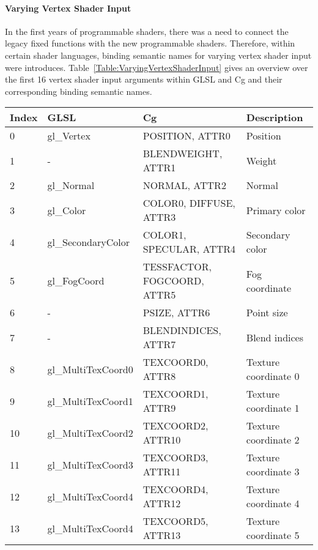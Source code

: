 \paragraph{Varying Vertex Shader Input}
In the first years of programmable shaders, there was a need to connect the legacy fixed functions with the new programmable shaders. Therefore, within certain shader languages, binding semantic names for varying vertex shader input were introduces. Table~\ref{Table:VaryingVertexShaderInput} gives an overview over the first 16 vertex shader input arguments within GLSL and Cg and their corresponding binding semantic names.
\begin{table}[htb]
	\centering
	\begin{ThreePartTable}
		\begin{tabular}{|l|l|p{}|l|}
			\toprule
				\textbf{Index} & \textbf{GLSL\tnote{1}} & \textbf{Cg\tnote{2}} & \textbf{Description}\\
			\midrule
				\hline
				0	&	gl\_Vertex			&	POSITION, ATTR0				&	Position\\
				\hline
				1	&	-					&	BLENDWEIGHT, ATTR1			&	Weight\\
				\hline
				2	&	gl\_Normal			&	NORMAL, ATTR2				&	Normal\\
				\hline
				3	&	gl\_Color			&	COLOR0, DIFFUSE, ATTR3		&	Primary color\\
				\hline
				4	&	gl\_SecondaryColor	&	COLOR1, SPECULAR, ATTR4		&	Secondary color\\
				\hline
				5	&	gl\_FogCoord		&	TESSFACTOR, FOGCOORD, ATTR5	&	Fog coordinate\\
				\hline
				6	&	-					&	PSIZE, ATTR6				&	Point size\\
				\hline
				7	&	-					&	BLENDINDICES, ATTR7			&	Blend indices\\
				\hline
				8	&	gl\_MultiTexCoord0	&	TEXCOORD0, ATTR8			&	Texture coordinate 0\\
				\hline
				9	&	gl\_MultiTexCoord1	&	TEXCOORD1, ATTR9			&	Texture coordinate 1\\
				\hline
				10	&	gl\_MultiTexCoord2	&	TEXCOORD2, ATTR10			&	Texture coordinate 2\\
				\hline
				11	&	gl\_MultiTexCoord3	&	TEXCOORD3, ATTR11			&	Texture coordinate 3\\
				\hline
				12	&	gl\_MultiTexCoord4	&	TEXCOORD4, ATTR12			&	Texture coordinate 4\\
				\hline
				13	&	gl\_MultiTexCoord4	&	TEXCOORD5, ATTR13			&	Texture coordinate 5\\

\end{tabular}
\end{ThreePartTable}
\end{table}
